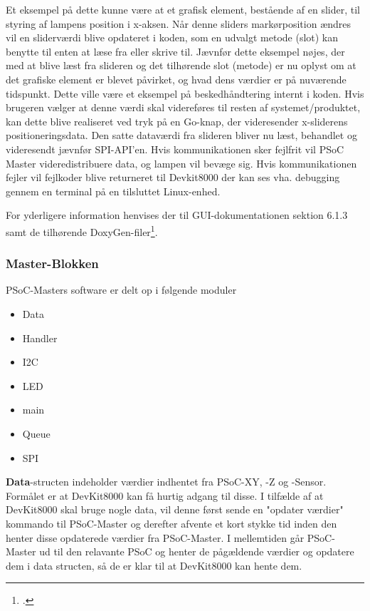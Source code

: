 Et eksempel på dette kunne være at et grafisk element, bestående af en slider, til styring af lampens position i x-aksen. Når denne sliders markørposition ændres vil en sliderværdi blive opdateret i koden, som en udvalgt metode (slot) kan benytte til enten at læse fra eller skrive til. Jævnfør dette eksempel nøjes, der med at blive læst fra slideren og det tilhørende slot (metode) er nu oplyst om at det grafiske element er blevet påvirket, og hvad dens værdier er på nuværende tidspunkt. Dette ville være et eksempel på beskedhåndtering internt i koden. Hvis brugeren vælger at denne værdi skal videreføres til resten af systemet/produktet, kan dette blive realiseret ved tryk på en Go-knap, der videresender x-sliderens positioneringsdata. Den satte dataværdi fra slideren bliver nu læst, behandlet og videresendt jævnfør SPI-API'en. Hvis kommunikationen sker fejlfrit vil PSoC Master videredistribuere data, og lampen vil bevæge sig. Hvis kommunikationen fejler vil fejlkoder blive returneret til Devkit8000 der kan ses vha. debugging gennem en terminal på en tilsluttet Linux-enhed.

For yderligere information henvises der til GUI-dokumentationen sektion 6.1.3 samt de tilhørende DoxyGen-filer\footcite{doxy-devkit}. 

\subsubsection{Master-Blokken}
PSoC-Masters software er delt op i følgende moduler

\begin{itemize}
    \item Data
    \item Handler
    \item I2C
    \item LED
    \item main
    \item Queue
    \item SPI
\end{itemize}

\textbf{Data}-structen indeholder værdier indhentet fra PSoC-XY, -Z og -Sensor.
Formålet er at DevKit8000 kan få hurtig adgang til disse. I tilfælde af at DevKit8000 skal bruge nogle data, vil denne først sende en "opdater værdier" kommando til PSoC-Master og derefter afvente et kort stykke tid inden den henter disse opdaterede værdier fra PSoC-Master. I mellemtiden går PSoC-Master ud til den relavante PSoC og henter de pågældende værdier og opdatere dem i data structen, så de er klar til at DevKit8000 kan hente dem.

